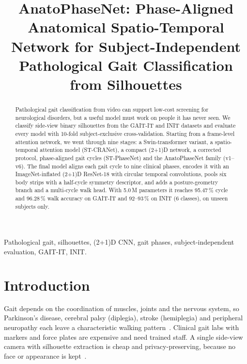 \documentclass[conference]{IEEEtran}
\begin{document}
\title{AnatoPhaseNet: Phase-Aligned Anatomical Spatio-Temporal Network for
Subject-Independent Pathological Gait Classification from Silhouettes}

\author{
}

\maketitle

\begin{abstract}
Pathological gait classification from video can support low-cost screening
for neurological disorders, but a useful model must work on people it has never
seen. We classify side-view binary silhouettes from the GAIT-IT and INIT
datasets and evaluate every model with 10-fold subject-exclusive
cross-validation. Starting from a frame-level attention network, we went through
nine stages: a Swin-transformer variant, a spatio-temporal attention model
(ST-CRANet), a compact (2+1)D network, a corrected protocol, phase-aligned gait
cycles (ST-PhaseNet) and the AnatoPhaseNet family (v1--v6). The final model
aligns each gait cycle to nine clinical phases, encodes it with an
ImageNet-inflated (2+1)D ResNet-18 with circular temporal convolutions, pools
six body strips with a half-cycle symmetry descriptor, and adds a
posture-geometry branch and a multi-cycle walk head. With 5.0\,M parameters it
reaches 95.47\,\% cycle and 96.28\,\% walk accuracy on GAIT-IT and 92--93\,\%
on INIT (6 classes), on unseen subjects only.
\end{abstract}

\begin{IEEEkeywords}
Pathological gait, silhouettes, (2+1)D CNN, gait phases, subject-independent
evaluation, GAIT-IT, INIT.
\end{IEEEkeywords}

\section{Introduction}
Gait depends on the coordination of muscles, joints and the nervous system, so
Parkinson's disease, cerebral palsy (diplegia), stroke (hemiplegia) and
peripheral neuropathy each leave a characteristic walking
pattern~\cite{baker2018}. Clinical gait labs with markers and force plates are
expensive and need trained staff. A single side-view camera with silhouette
extraction is cheap and privacy-preserving, because no face or appearance is
kept~\cite{albuquerque2021}.
\end{document}
